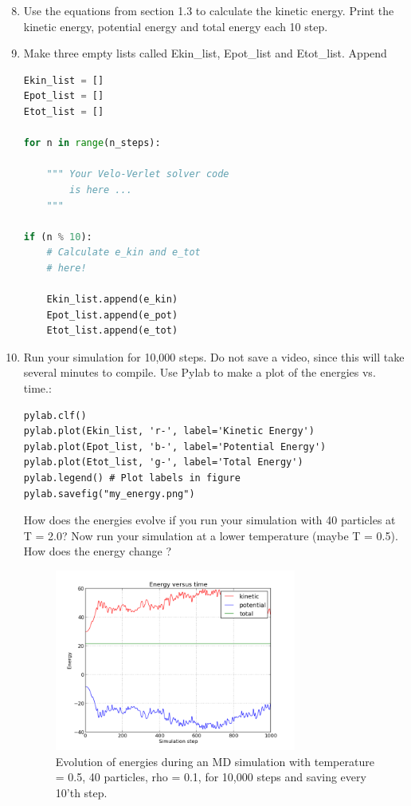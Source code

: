 \documentclass{article}
\begin{document}
\begin{enumerate}
    \setcounter{enumi}{7}

    \item Use the equations from section 1.3 to calculate the kinetic energy.
        Print the kinetic energy, potential energy and total energy each 10
        step.

    \item Make three empty lists called Ekin\_list, Epot\_list and Etot\_list.
        Append

\begin{lstlisting}[language=python]
Ekin_list = []
Epot_list = []
Etot_list = []

for n in range(n_steps):

    """ Your Velo-Verlet solver code
        is here ...
    """

if (n % 10):
    # Calculate e_kin and e_tot
    # here!

    Ekin_list.append(e_kin)
    Epot_list.append(e_pot)
    Etot_list.append(e_tot)
\end{lstlisting}

    \item Run your simulation for 10,000 steps. Do not save a video, since this
        will take several minutes to compile. Use Pylab to make a plot of the
        energies vs. time.:

\begin{lstlisting}
pylab.clf()
pylab.plot(Ekin_list, 'r-', label='Kinetic Energy')
pylab.plot(Epot_list, 'b-', label='Potential Energy')
pylab.plot(Etot_list, 'g-', label='Total Energy')
pylab.legend() # Plot labels in figure
pylab.savefig("my_energy.png")
\end{lstlisting}

    How does the energies evolve if you run your simulation with 40 particles at T =
    2.0? Now run your simulation at a lower temperature (maybe T = 0.5). How does
    the energy change ?

    \begin{figure}[h!]
        \begin{center}
            \includegraphics[width=0.75\textwidth]{energy.png}
            \caption{
                Evolution of energies during an MD simulation with
                temperature = 0.5, 40 particles, rho = 0.1, for 10,000 steps
                and saving every 10'th step.
            }
            \label{fig:energies}
        \end{center}
    \end{figure}



\end{enumerate}
\end{document}
